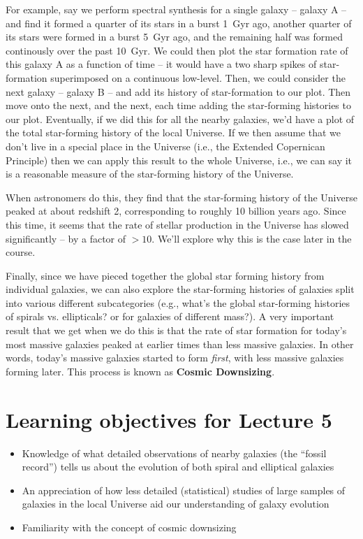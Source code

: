 \documentclass[11pt]{article}
\begin{document}
For example, say we perform spectral synthesis for a single galaxy --
galaxy A -- and find it formed a quarter of its stars in a burst 1~Gyr
ago, another quarter of its stars were formed in a burst 5~Gyr ago,
and the remaining half was formed continously over the past 10~Gyr. We
could then plot the star formation rate of this galaxy A as a function
of time -- it would have a two sharp spikes of star-formation
superimposed on a continuous low-level. Then, we could consider the
next galaxy -- galaxy B -- and add its history of star-formation to
our plot. Then move onto the next, and the next, each time adding the
star-forming histories to our plot. Eventually, if we did this for all
the nearby galaxies, we'd have a plot of the total star-forming
history of the local Universe. If we then assume that we don't live in
a special place in the Universe (i.e., the Extended Copernican
Principle) then we can apply this result to the whole Universe, i.e.,
we can say it is a reasonable measure of the star-forming history of
the Universe.

When astronomers do this, they find that the star-forming history of
the Universe peaked at about redshift 2, corresponding to roughly
10 billion years ago. Since this time, it seems that the rate of
stellar production in the Universe has slowed significantly -- by a
factor of $>10$. We'll explore why this is the case later in the
course.

Finally, since we have pieced together the global star forming history
from individual galaxies, we can also explore the star-forming
histories of galaxies split into various different subcategories
(e.g., what's the global star-forming histories of spirals
vs. ellipticals? or for galaxies of different mass?). A very important
result that we get when we do this is that the rate of star formation
for today's most massive galaxies peaked at earlier times than less
massive galaxies. In other words, today's massive galaxies started to
form {\it first}, with less massive galaxies forming later. This
process is known as {\bf Cosmic Downsizing}.

\section{Learning objectives for Lecture 5}
\begin{itemize}
\item Knowledge of what detailed observations of nearby galaxies (the “fossil record”) tells us about the evolution of both spiral and elliptical galaxies
\item An appreciation of how less detailed (statistical) studies of large samples of galaxies in the local Universe aid our understanding of galaxy evolution
\item Familiarity with the concept of cosmic downsizing
\end{itemize}
\end{document}

